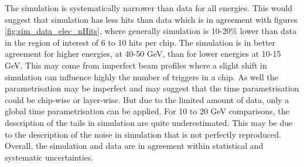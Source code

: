 The simulation is systematically narrower than data for all energies. This would suggest that simulation has less hits than data which is in agreement with figures \ref{fig:sim_data_elec_nHits}, where generally simulation is 10-20\% lower than data in the region of interest of 6 to 10 hits per chip. The simulation is in better agreement for higher energies, at 40-50 GeV, than for lower energies at 10-15 GeV. This may come from imperfect beam profiles where a slight shift in simulation can influence highly the number of triggers in a chip. As well the parametrisation may be imperfect and may suggest that the time parametrisation could be chip-wise or layer-wise. But due to the limited amount of data, only a global time parametrisation can be applied. For 10 to 20 GeV comparisons, the description of the tails in simulation are quite underestimated. This may be due to the description of the noise in simulation that is not perfectly reproduced. Overall, the simulation and data are in agreement within statistical and systematic uncertainties.

